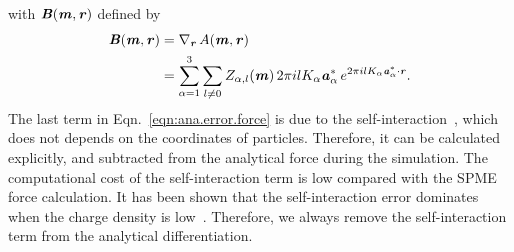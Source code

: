 \documentclass[aps,pre,preprint,unsortedaddress]{revtex4}
\newcommand{\redc}[1]{{\color{red} #1}}
\renewcommand{\v}[1]{\textbf{\textit{#1}}}
\begin{document}
with $\v B(\v m, \v r)$ defined by
\begin{align}\nonumber
  \v B(\v m, \v r)
  &=
  \nabla_{\v r}\,A(\v m, \v r)\\\label{eqn:error-B}
  &=
  \sum_{\alpha=1}^3\sum_{l\neq 0}
  Z_{\alpha,l}(\v m)\,
  2\pi i l K_\alpha\v a_\alpha^\ast\,e^{2\pi i l K_\alpha\v a^\ast_\alpha\cdot \v r}.
\end{align}
The last term in Eqn.~\eqref{eqn:ana.error.force} is due to the
self-interaction~\cite{cerutti2009staggered, ballenegger2011removal,
  neelov2010interlaced}, which does not depends on the coordinates of
particles. Therefore, it can be calculated explicitly, and subtracted
from the analytical force during the simulation. The computational cost of
the self-interaction term is low \redc{compared} with the SPME
force calculation. It \redc{has been} shown that the self-interaction  error
\redc{dominates} when the charge density is low~\cite{cerutti2009staggered}.
Therefore, we always remove the self-interaction term from
the analytical differentiation.
\end{document}
